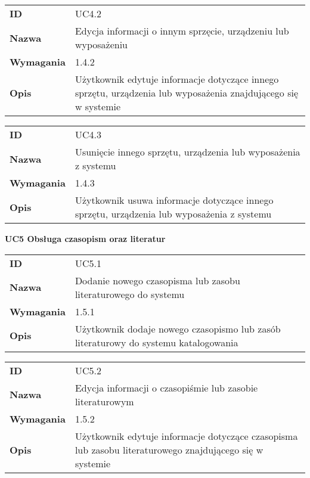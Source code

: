 \vspace{.05\textheight}

\begin{tabular}{p{}p{}}
\hfill {\bf ID} & UC4.2 \\
\hfill {\bf Nazwa} & Edycja informacji o innym sprzęcie, urządzeniu lub wyposażeniu \\
\hfill {\bf Wymagania} & 1.4.2  \\
\hfill {\bf Opis} & Użytkownik edytuje informacje dotyczące innego sprzętu, urządzenia lub wyposażenia znajdującego się w systemie \\
\end{tabular}

\vspace{.05\textheight}

\begin{tabular}{p{}p{}}
\hfill {\bf ID} & UC4.3  \\
\hfill {\bf Nazwa} & Usunięcie innego sprzętu, urządzenia lub wyposażenia z systemu \\
\hfill {\bf Wymagania} & 1.4.3 \\
\hfill {\bf Opis} & Użytkownik usuwa informacje dotyczące innego sprzętu, urządzenia lub wyposażenia z systemu \\
\end{tabular}

\vspace{.03\textheight}
\begin{center}
  {\Large\bf UC5 Obsługa czasopism oraz literatur } \\
\end{center}
\vspace{.02\textheight}

\begin{tabular}{p{}p{}}
\hfill {\bf ID} & UC5.1 \\
\hfill {\bf Nazwa} & Dodanie nowego czasopisma lub zasobu literaturowego do systemu \\
\hfill {\bf Wymagania} & 1.5.1 \\
\hfill {\bf Opis} & Użytkownik dodaje nowego czasopismo lub zasób literaturowy do systemu katalogowania \\
\end{tabular}

\vspace{.05\textheight}

\begin{tabular}{p{}p{}}
\hfill {\bf ID} & UC5.2 \\
\hfill {\bf Nazwa} & Edycja informacji o czasopiśmie lub zasobie literaturowym  \\
\hfill {\bf Wymagania} & 1.5.2 \\
\hfill {\bf Opis} &  Użytkownik edytuje informacje dotyczące czasopisma lub zasobu literaturowego znajdującego się w systemie \\
\end{tabular}

